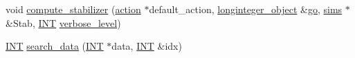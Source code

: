 \begin{DoxyCompactItemize}
\item 
void \mbox{\hyperlink{classorbit__of__subspaces_a417479ac6c67e0a70ccd873212f504a9}{compute\+\_\+stabilizer}} (\mbox{\hyperlink{classaction}{action}} $\ast$default\+\_\+action, \mbox{\hyperlink{classlonginteger__object}{longinteger\+\_\+object}} \&\mbox{\hyperlink{simeon_8_c_a1516b736c8ebbfb03a9dd7d8826cd9a6}{go}}, \mbox{\hyperlink{classsims}{sims}} $\ast$\&Stab, \mbox{\hyperlink{galois_8h_a09fddde158a3a20bd2dcadb609de11dc}{I\+NT}} \mbox{\hyperlink{simeon_8_c_a818073fbcc2f439e7c56952f67386122}{verbose\+\_\+level}})
\item 
\mbox{\hyperlink{galois_8h_a09fddde158a3a20bd2dcadb609de11dc}{I\+NT}} \mbox{\hyperlink{classorbit__of__subspaces_ae9f5bcb67f33c3ea80a7ce690301dc50}{search\+\_\+data}} (\mbox{\hyperlink{galois_8h_a09fddde158a3a20bd2dcadb609de11dc}{I\+NT}} $\ast$data, \mbox{\hyperlink{galois_8h_a09fddde158a3a20bd2dcadb609de11dc}{I\+NT}} \&idx)
\end{DoxyCompactItemize}
